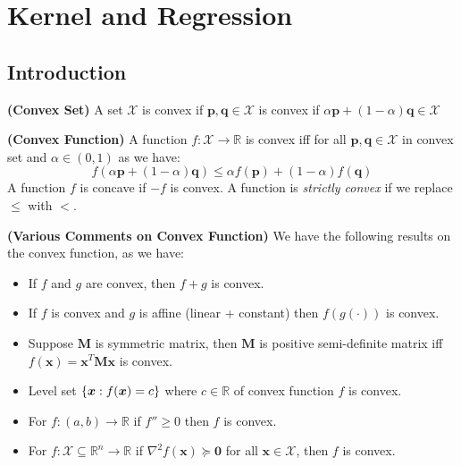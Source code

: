 \section{Kernel and Regression}

\subsection{Introduction}

\begin{definition}{\textbf{(Convex Set)}}
    A set $\mathcal{X}$ is convex if $\boldsymbol p, \boldsymbol q \in \mathcal{X}$ is convex if $\alpha \boldsymbol p + (1-\alpha)\boldsymbol q \in \mathcal{X}$
\end{definition}

\begin{definition}{\textbf{(Convex Function)}}
    A function $f : \mathcal{X}\rightarrow \mathbb{R}$ is convex iff for all $\boldsymbol p, \boldsymbol q \in \mathcal{X}$ in convex set and $\alpha\in(0, 1)$ as we have:
    \begin{equation*}
        f(\alpha \boldsymbol p + (1-\alpha)\boldsymbol q) \le \alpha f(\boldsymbol p) + (1-\alpha)f(\boldsymbol q)
    \end{equation*}
    A function $f$ is concave if $-f$ is convex. A function is \emph{strictly convex} if we replace $\le$ with $<$. 
\end{definition}

\begin{remark}{\textbf{(Various Comments on Convex Function)}}
    We have the following results on the convex function, as we have:
    \begin{itemize}
        \item If $f$ and $g$ are convex, then $f + g$ is convex. 
        \item If $f$ is convex and $g$ is affine (linear + constant) then $f(g(\cdot))$ is convex. 
        \item Suppose $\boldsymbol M$ is symmetric matrix, then $\boldsymbol M$ is positive semi-definite matrix iff $f(\boldsymbol x) = \boldsymbol x^T\boldsymbol M\boldsymbol x$ is convex. 
        \item Level set $\left\{ \boldsymbol x : f(\boldsymbol x) = c \right\}$ where $c \in \mathbb{R}$ of convex function $f$ is convex.
        \item For $f: (a, b) \rightarrow \mathbb{R}$ if $f''\ge0$ then $f$ is convex.
        \item For $f: \mathcal{X} \subseteq \mathbb{R}^n \rightarrow \mathbb{R}$ if $\nabla^2 f(\boldsymbol x)\succeq \boldsymbol 0$ for all $\boldsymbol x \in \mathcal{X}$, then $f$ is convex.
    \end{itemize}
\end{remark}

